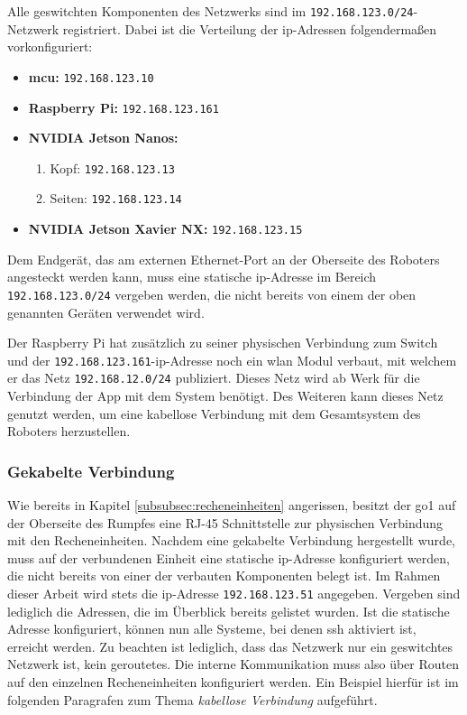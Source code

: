 Alle geswitchten Komponenten des Netzwerks sind im \texttt{192.168.123.0/24}-Netzwerk registriert.
Dabei ist die Verteilung der \gls{ip}-Adressen folgendermaßen vorkonfiguriert:
\begin{itemize}
    \item \textbf{\gls{mcu}:} \texttt{192.168.123.10}
    \item \textbf{Raspberry Pi:} \texttt{192.168.123.161}
    \item \textbf{NVIDIA Jetson Nanos:}
    \begin{enumerate}
        \item Kopf: \texttt{192.168.123.13}
        \item Seiten: \texttt{192.168.123.14}
    \end{enumerate}
    \item \textbf{NVIDIA Jetson Xavier NX:} \texttt{192.168.123.15}
\end{itemize}
Dem Endgerät, das am externen Ethernet-Port an der Oberseite des Roboters angesteckt werden kann,
muss eine statische \gls{ip}-Adresse im Bereich \texttt{192.168.123.0/24} vergeben werden, die nicht bereits von einem der oben genannten
Geräten verwendet wird.

Der Raspberry Pi hat zusätzlich zu seiner physischen Verbindung zum Switch und der \texttt{192.168.123.161}-\gls{ip}-Adresse
noch ein \gls{wlan} Modul verbaut, mit welchem er das Netz \texttt{192.168.12.0/24} publiziert.
Dieses Netz wird ab Werk für die Verbindung der App mit dem System benötigt.
Des Weiteren kann dieses Netz genutzt werden, um eine kabellose Verbindung mit dem Gesamtsystem
des Roboters herzustellen.

\subsubsection{Gekabelte Verbindung}

Wie bereits in Kapitel \ref{subsubsec:recheneinheiten} angerissen, besitzt der \gls{go1} auf der Oberseite des Rumpfes
eine RJ-45 Schnittstelle zur physischen Verbindung mit den Recheneinheiten.
Nachdem eine gekabelte Verbindung hergestellt wurde, muss auf der verbundenen Einheit eine statische \gls{ip}-Adresse
konfiguriert werden, die nicht bereits von einer der verbauten Komponenten belegt ist.
Im Rahmen dieser Arbeit wird stets die \gls{ip}-Adresse \texttt{192.168.123.51} angegeben.
Vergeben sind lediglich die Adressen, die im Überblick bereits gelistet wurden.
Ist die statische Adresse konfiguriert, können nun alle Systeme, bei denen \gls{ssh} aktiviert ist, erreicht werden.
Zu beachten ist lediglich, dass das Netzwerk nur ein geswitchtes Netzwerk ist, kein geroutetes.
Die interne Kommunikation muss also über Routen auf den einzelnen Recheneinheiten konfiguriert werden.
Ein Beispiel hierfür ist im folgenden Paragrafen zum Thema \emph{kabellose Verbindung} aufgeführt.

